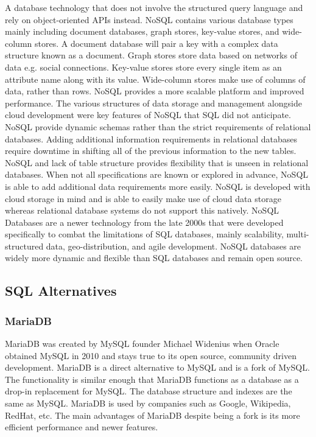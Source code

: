 \documentclass[12pt]{report}
\begin{document}
A database technology that does not involve the structured query language and rely on object-oriented APIs instead.  NoSQL contains various database types mainly including document databases, graph stores, key-value stores, and wide-column stores.  A document database will pair a key with a complex data structure known as a document.  Graph stores store data based on networks of data e.g. social connections.  Key-value stores store every single item as an attribute name along with its value.  Wide-column stores make use of columns of data, rather than rows.  NoSQL provides a more scalable platform and improved performance.  The various structures of data storage and management alongside cloud development were key features of NoSQL that SQL did not anticipate.  
NoSQL provide dynamic schemas rather than the strict requirements of relational databases.  Adding additional information requirements in relational databases require downtime in shifting all of the previous information to the new tables.  NoSQL and lack of table structure provides flexibility that is unseen in relational databases.  When not all specifications are known or explored in advance, NoSQL is able to add additional data requirements more easily.  NoSQL is developed with cloud storage in mind and is able to easily make use of cloud data storage whereas relational database systems do not support this natively.  
NoSQL Databases are a newer technology from the late 2000s that were developed specifically to combat the limitations of SQL databases, mainly scalability, multi-structured data, geo-distribution, and agile development.  NoSQL databases are widely more dynamic and flexible than SQL databases and remain open source.

\subsection*{SQL Alternatives}

\subsubsection*{MariaDB}

MariaDB was created by MySQL founder Michael Widenius when Oracle obtained MySQL in 2010 and stays true to its open source, community driven development.  MariaDB is a direct alternative to MySQL and is a fork of MySQL.  The functionality is similar enough that MariaDB functions as a database as a drop-in replacement for MySQL.  The database structure and indexes are the same as MySQL.  MariaDB is used by companies such as Google, Wikipedia, RedHat, etc.  The main advantages of MariaDB despite being a fork is its more efficient performance and newer features.
\end{document}
